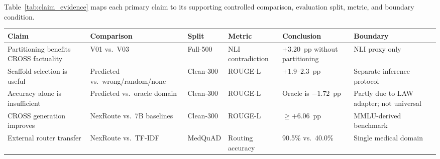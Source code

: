 \documentclass[a4paper,fleql,doubleblind]{cas-sc}
\begin{document}
Table~\ref{tab:claim_evidence} maps each primary claim to its supporting
controlled comparison, evaluation split, metric, and boundary condition.

\vspace{4pt}
\begin{center}
\begingroup
\renewcommand{\arraystretch}{1.25}
\label{tab:claim_evidence}
\small
\begin{tabular}{p{3.0cm} p{2.2cm} p{1.5cm} p{1.8cm} p{2.2cm} p{2.2cm}}
\toprule
\textbf{Claim} & \textbf{Comparison} & \textbf{Split} & \textbf{Metric} & \textbf{Conclusion} & \textbf{Boundary} \\
\midrule
Partitioning benefits CROSS factuality & V01 vs.\ V03 & Full-500 & NLI contradiction & $+3.20$~pp without partitioning & NLI proxy only \\
Scaffold selection is useful & Predicted vs.\ wrong/random/none & Clean-300 & ROUGE-L & $+1.9$--$2.3$~pp & Separate inference protocol \\
Accuracy alone is insufficient & Predicted vs.\ oracle domain & Clean-300 & ROUGE-L & Oracle is $-1.72$~pp & Partly due to LAW adapter; not universal \\
CROSS generation improves & NexRoute vs.\ 7B baselines & Clean-300 & ROUGE-L & ${\geq}+6.06$~pp & MMLU-derived benchmark \\
External router transfer & NexRoute vs.\ TF-IDF & MedQuAD & Routing accuracy & 90.5\% vs.\ 40.0\% & Single medical domain \\
\bottomrule
\end{tabular}
\endgroup
\end{center}
\vspace{4pt}
\end{document}
